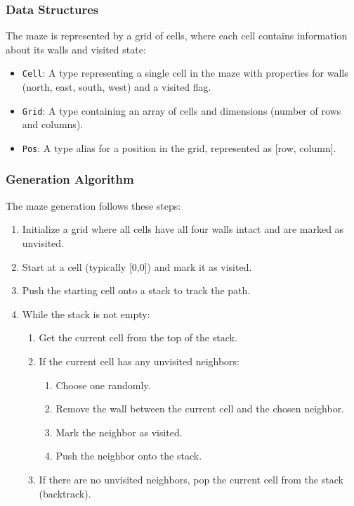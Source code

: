 \documentclass{article}
\begin{document}
\subsubsection{Data Structures}
The maze is represented by a grid of cells, where each cell contains information about its walls and visited state:
\begin{itemize}
    \item \texttt{Cell}: A type representing a single cell in the maze with properties for walls (north, east, south, west) and a visited flag.
    \item \texttt{Grid}: A type containing an array of cells and dimensions (number of rows and columns).
    \item \texttt{Pos}: A type alias for a position in the grid, represented as [row, column].
\end{itemize}

\subsubsection{Generation Algorithm}
The maze generation follows these steps:
\begin{enumerate}
    \item Initialize a grid where all cells have all four walls intact and are marked as unvisited.
    \item Start at a cell (typically [0,0]) and mark it as visited.
    \item Push the starting cell onto a stack to track the path.
    \item While the stack is not empty:
    \begin{enumerate}
        \item Get the current cell from the top of the stack.
        \item If the current cell has any unvisited neighbors:
        \begin{enumerate}
            \item Choose one randomly.
            \item Remove the wall between the current cell and the chosen neighbor.
            \item Mark the neighbor as visited.
            \item Push the neighbor onto the stack.
        \end{enumerate}
        \item If there are no unvisited neighbors, pop the current cell from the stack (backtrack).
    \end{enumerate}
\end{enumerate}
\end{document}

